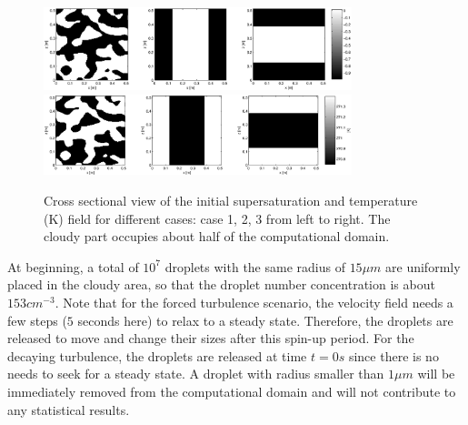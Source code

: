 \begin{figure}[!htbp]\centering
\includegraphics[width=0.8\textwidth]{Figures/supersat_case123}\\
\includegraphics[width=0.8\textwidth]{Figures/temp_case123}
\caption{Cross sectional view of the initial supersaturation and temperature (K) field for different cases: case 1, 2, 3 from left to right. The cloudy part occupies about half of the computational domain.\label{fig:slice_case123}}
\end{figure}

At beginning, a total of $10^{7}$ droplets with the same radius of $15\mu m$
are uniformly placed in the cloudy area, so that the droplet number
concentration is about $153{cm}^{-3}$. Note that for the forced turbulence
scenario, the velocity field needs a few steps ($5$ seconds here) to relax to a
steady state. Therefore, the droplets are released to move and change their
sizes after this spin-up period. For the decaying
turbulence, the droplets are released at time $t = 0s$ since there is no needs
to seek for a steady state. A droplet with radius smaller than $1\mu m$ will be
immediately removed from the computational domain and will not contribute to
any statistical results.

